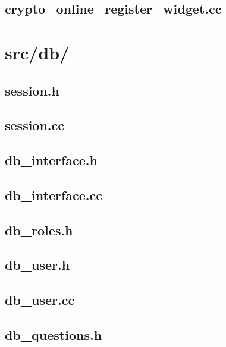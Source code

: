 \subsection{crypto\_online\_register\_widget.cc}

\newpage

\section{src/db/}

\subsection{session.h}

\newpage

\subsection{session.cc}

\newpage

\subsection{db\_interface.h}

\newpage

\subsection{db\_interface.cc}

\newpage

\subsection{db\_roles.h}

\newpage

\subsection{db\_user.h}

\newpage

\subsection{db\_user.cc}

\newpage

\subsection{db\_questions.h}

\newpage

